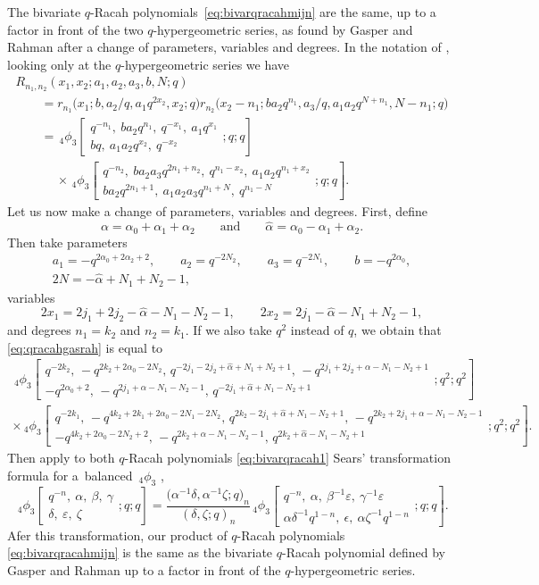 \documentclass[pdftex]{sigma}
\numberwithin{equation}{section}
\newcommand{\qhyp}[5]{\,_{#1}\phi_{#2} \left[ \begin{matrix}
		#3 \\ #4 \end{matrix};#5 \right]}
\begin{document}
\begin{Remark}
	The bivariate $q$-Racah polynomials~\eqref{eq:bivarqracahmijn} are the same, up to a factor in front of the two $q$-hypergeometric series, as found by Gasper and Rahman \cite{Gasper2007} after a change of parameters, variables and degrees. In the notation of \cite[equation~(2.6)]{Gasper2007}, looking only at the $q$-hypergeometric series we have
	\begin{gather}
R_{n_1,n_2}(x_1,x_2;a_1,a_2,a_3,b,N;q)\nonumber\\
\qquad{} =r_{n_1}\big(x_1;b,a_2/q,a_1q^{2x_2},x_2;q\big)r_{n_2}\big(x_2-n_1;ba_2q^{n_1},a_3/q,a_1a_2q^{N+n_1},N-n_1;q\big)\nonumber\\
\qquad{} = \qhyp{4}{3}{q^{-n_1},\ ba_2q^{n_1},\ q^{-x_1},\ a_1q^{x_1}}{bq,\ a_1a_2q^{x_2},\ q^{-x_2}}{q;q}\nonumber\\
\qquad\quad \ {}\times \qhyp{4}{3}{q^{-n_2},\ ba_2a_3q^{2n_1+n_2},\ q^{n_1-x_2},\ a_1a_2q^{n_1+x_2}}{ba_2q^{2n_1+1},\ a_1a_2a_3q^{n_1+N},\ q^{n_1-N}}{q;q}.\label{eq:qracahgasrah}
	\end{gather}
Let us now make a change of parameters, variables and degrees. First, define
\[
	\alpha=\alpha_0+\alpha_1+\alpha_2\qquad \text{and}\qquad \hat{\alpha}=\alpha_0-\alpha_1+\alpha_2.
	\]
Then take parameters
	\begin{gather*}
	a_1=-q^{2\alpha_0+2\alpha_2+2},\qquad a_2=q^{-2N_2},\qquad a_3=q^{-2N_1},\qquad b=-q^{2\alpha_0},\\ 2N=-\hat{\alpha}+N_1+N_2-1,
	\end{gather*}
	variables
	\[
	2x_1=2j_1+2j_2-\hat{\alpha}-N_1-N_2-1,\qquad 2x_2=2j_1-\hat{\alpha}-N_1+N_2-1,
	\]
	and degrees $n_1=k_2$ and $n_2=k_1$. If we also take $q^2$ instead of $q$, we obtain that \eqref{eq:qracahgasrah} is equal to
	\begin{gather}
		\qhyp{4}{3}{q^{-2k_2},\, -q^{2k_2+2\alpha_0-2N_2},\, q^{-2j_1-2j_2+\hat{\alpha}+N_1+N_2+1},\, -q^{2j_1+2j_2+\alpha-N_1-N_2+1}}{-q^{2\alpha_0+2},\, -q^{2j_1+\alpha-N_1-N_2-1},\, q^{-2j_1+\hat{\alpha}+N_1-N_2+1}}{q^2;q^2}\label{eq:bivarqracah1}\\
		\times\qhyp{4}{3}{q^{-2k_1},\, -q^{4k_2+2k_1+2\alpha_0-2N_1-2N_2},\, q^{2k_2-2j_1+\hat{\alpha}+N_1-N_2+1},\, -q^{2k_2+2j_1+\alpha-N_1-N_2-1}}{-q^{4k_2+2\alpha_0-2N_2+2},\, -q^{2k_2+\alpha-N_1-N_2-1},\, q^{2k_2+\hat{\alpha}-N_1-N_2+1}}{q^2;q^2}\!.\nonumber%
	\end{gather}
	Then apply to both $q$-Racah polynomials \eqref{eq:bivarqracah1} %
Sears' transformation formula for a~balanced~${}_{4}\phi_{3}$ \cite[equation~(III.15)]{GR2004},
	\[\qhyp{4}{3}{q^{-n},\ \alpha,\ \beta,\ \gamma}{\delta,\ \varepsilon,\ \zeta}{q;q}=\frac{\big(\alpha^{-1}\delta,\alpha^{-1}\zeta;q\big)_n}{(\delta,\zeta;q)_n}\qhyp{4}{3}{q^{-n},\ \alpha,\ \beta^{-1}\varepsilon,\ \gamma^{-1}\varepsilon}{\alpha\delta^{-1}q^{1-n},\ \epsilon,\ \alpha\zeta^{-1}q^{1-n}}{q;q}.\]
	Afer this transformation, our product of $q$-Racah polynomials \eqref{eq:bivarqracahmijn} is the same as the bivariate $q$-Racah polynomial defined by Gasper and Rahman \cite{Gasper2007} up to a factor in front of the $q$-hypergeometric series.
\end{Remark}
\end{document}
